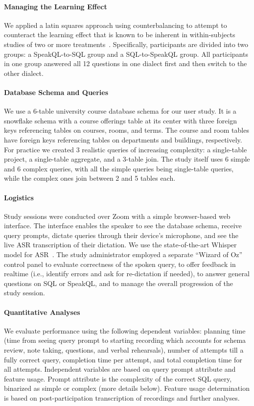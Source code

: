 \paragraph{\textbf{Managing the Learning Effect}}
We applied a latin squares approach using counterbalancing to attempt to counteract the learning effect that is known to be inherent in within-subjects studies of two or more treatments~\cite{10.5555/2501707}. 
Specifically, participants are divided into two groups: a SpeakQL-to-SQL group and a SQL-to-SpeakQL group. 
All participants in one group answered all 12 questions in one dialect first and then switch to the other dialect.

\paragraph{\textbf{Database Schema and Queries}}
We use a 6-table university course database schema for our user study. 
It is a snowflake schema with a course offerings table at its center with three foreign keys referencing tables on courses, rooms, and terms. 
The course and room tables have foreign keys referencing tables on departments and buildings, respectively.
For practice we created 3 realistic queries of increasing complexity: a single-table project, a single-table aggregate, and a 3-table join. 
The study itself uses 6 simple and 6 complex queries, with all the simple queries being single-table queries, while the complex ones join between 2 and 5 tables each.

\paragraph{\textbf{Logistics}} 
Study sessions were conducted over Zoom with a simple browser-based web interface. 
The interface enables the speaker to see the database schema, receive query prompts, dictate queries through their device's microphone, and see the live ASR transcription of their dictation. 
We use the state-of-the-art Whisper model for ASR~\cite{https://doi.org/10.48550/arxiv.2212.04356}. 
The study administrator employed a separate ``Wizard of Oz'' control panel to evaluate correctness of the spoken query, to offer feedback in realtime (i.e., identify errors and ask for re-dictation if needed), to answer general questions on SQL or SpeakQL, and to manage the overall progression of the study session. 

\paragraph{\textbf{Quantitative Analyses}}
We evaluate performance using the following dependent variables: planning time (time from seeing query prompt to starting recording which accounts for schema review, note taking, questions, and verbal rehearsals), number of attempts till a fully correct query, completion time per attempt, and total completion time for all attempts.
Independent variables are based on query prompt attribute and feature usage. 
Prompt attribute is the complexity of the correct SQL query, binarized as simple or complex (more details below). 
Feature usage determination is based on post-participation transcription of recordings and further analyses. 

